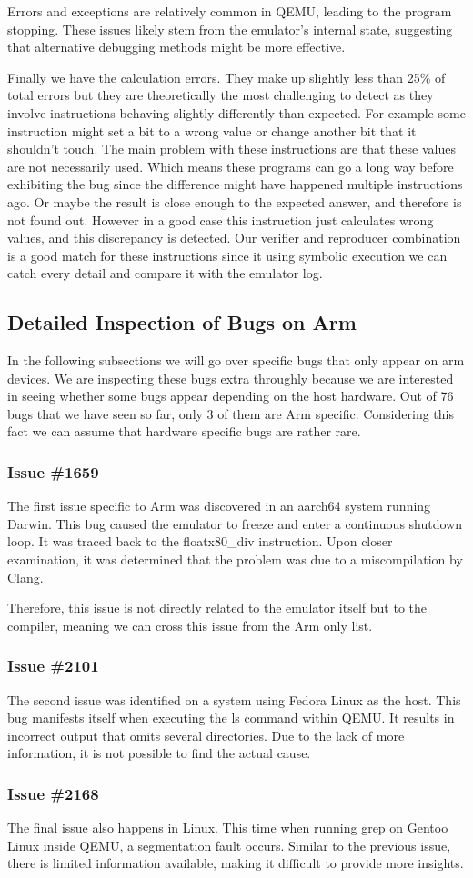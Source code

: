 Errors and exceptions are relatively common in QEMU, leading to the program stopping. These issues likely stem from the emulator's internal state, suggesting that alternative debugging methods might be more effective.

Finally we have the calculation errors.
They make up slightly less than 25\% of total errors but they are theoretically the most challenging to detect as they involve instructions behaving slightly differently than expected.
For example some instruction might set a bit to a wrong value or change another bit that it shouldn't touch.
The main problem with these instructions are that these values are not necessarily used.
Which means these programs can go a long way before exhibiting the bug since the difference might have happened multiple instructions ago.
Or maybe the result is close enough to the expected answer, and therefore is not found out.
However in a good case this instruction just calculates wrong values, and this discrepancy is detected.
Our verifier and reproducer combination is a good match for these instructions since it using symbolic execution we can catch every detail and compare it with the emulator log.

\subsection{Detailed Inspection of Bugs on Arm}
In the following subsections we will go over specific bugs that only appear on arm devices.
We are inspecting these bugs extra throughly because we are interested in seeing whether some bugs appear depending on the host hardware.
Out of 76 bugs that we have seen so far, only 3 of them are Arm specific.
Considering this fact we can assume that hardware specific bugs are rather rare.

\subsubsection{Issue \#1659}
The first issue specific to Arm was discovered in an aarch64 system running Darwin.
This bug caused the emulator to freeze and enter a continuous shutdown loop.
It was traced back to the floatx80\_div instruction.
Upon closer examination, it was determined that the problem was due to a miscompilation by Clang.

Therefore, this issue is not directly related to the emulator itself but to the compiler, meaning we can cross this issue from the Arm only list.

\subsubsection{Issue \#2101}
The second issue was identified on a system using Fedora Linux as the host.
This bug manifests itself when executing the ls command within QEMU.
It results in incorrect output that omits several directories.
Due to the lack of more information, it is not possible to find the actual cause.

\subsubsection{Issue \#2168}
The final issue also happens in Linux.
This time when running grep on Gentoo Linux inside QEMU, a segmentation fault occurs.
Similar to the previous issue, there is limited information available, making it difficult to provide more insights.



